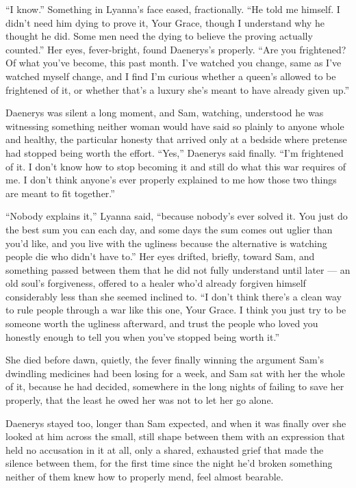 “I know.” Something in Lyanna’s face eased, fractionally. “He told me himself. I didn’t need him dying to prove it, Your Grace, though I understand why he thought he did. Some men need the dying to believe the proving actually counted.” Her eyes, fever-bright, found Daenerys’s properly. “Are you frightened? Of what you’ve become, this past month. I’ve watched you change, same as I’ve watched myself change, and I find I’m curious whether a queen’s allowed to be frightened of it, or whether that’s a luxury she’s meant to have already given up.”

Daenerys was silent a long moment, and Sam, watching, understood he was witnessing something neither woman would have said so plainly to anyone whole and healthy, the particular honesty that arrived only at a bedside where pretense had stopped being worth the effort. “Yes,” Daenerys said finally. “I’m frightened of it. I don’t know how to stop becoming it and still do what this war requires of me. I don’t think anyone’s ever properly explained to me how those two things are meant to fit together.”

“Nobody explains it,” Lyanna said, “because nobody’s ever solved it. You just do the best sum you can each day, and some days the sum comes out uglier than you’d like, and you live with the ugliness because the alternative is watching people die who didn’t have to.” Her eyes drifted, briefly, toward Sam, and something passed between them that he did not fully understand until later — an old soul’s forgiveness, offered to a healer who’d already forgiven himself considerably less than she seemed inclined to. “I don’t think there’s a clean way to rule people through a war like this one, Your Grace. I think you just try to be someone worth the ugliness afterward, and trust the people who loved you honestly enough to tell you when you’ve stopped being worth it.”

\sceneBreak

She died before dawn, quietly, the fever finally winning the argument Sam’s dwindling medicines had been losing for a week, and Sam sat with her the whole of it, because he had decided, somewhere in the long nights of failing to save her properly, that the least he owed her was not to let her go alone.

Daenerys stayed too, longer than Sam expected, and when it was finally over she looked at him across the small, still shape between them with an expression that held no accusation in it at all, only a shared, exhausted grief that made the silence between them, for the first time since the night he’d broken something neither of them knew how to properly mend, feel almost bearable.

